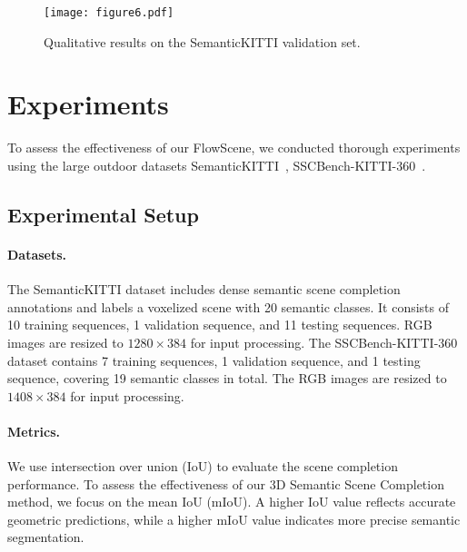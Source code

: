 \begin{figure*}[t]
\centering
  \texttt{[image: figure6.pdf]}
  \caption{Qualitative results on the SemanticKITTI validation set.}
  \label{fig:figure6}
\end{figure*}


\section{Experiments}
To assess the effectiveness of our FlowScene, we conducted thorough experiments using the large outdoor datasets SemanticKITTI~\cite{behley2019semantickitti,Geiger2012kitti}, SSCBench-KITTI-360~\cite{li2023sscbench,Liao2022kitti360}.
\subsection{Experimental Setup}
\paragraph{Datasets.} 
The SemanticKITTI\cite{behley2019semantickitti, Geiger2012kitti} dataset includes dense semantic scene completion annotations and labels a voxelized scene with 20 semantic classes. It consists of 10 training sequences, 1 validation sequence, and 11 testing sequences. RGB images are resized to $1280\times384$ for input processing.
The SSCBench-KITTI-360\cite{li2023sscbench, Liao2022kitti360} dataset contains 7 training sequences, 1 validation sequence, and 1 testing sequence, covering 19 semantic classes in total. The RGB images are resized to $1408\times384$ for input processing.
\vspace{-5mm}
\paragraph{Metrics.} We use intersection over union (IoU) to evaluate the scene completion performance. To assess the effectiveness of our 3D Semantic Scene Completion method, we focus on the mean IoU (mIoU). A higher IoU value reflects accurate geometric predictions, while a higher mIoU value indicates more precise semantic segmentation.
\vspace{-5mm}
